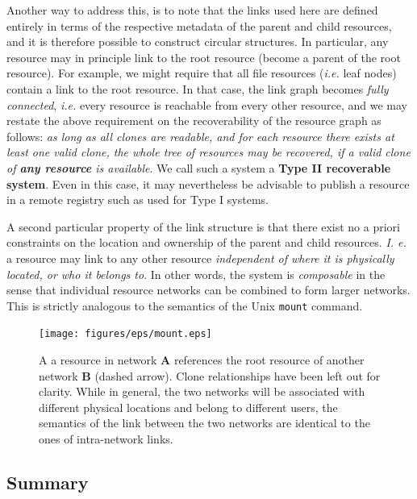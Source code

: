 \documentclass[11pt]{article}
\begin{document}
\begin{mainmatter}
Another way to address this, is to note that the links used here are defined entirely in terms of the respective metadata of the parent and child resources, and it is therefore possible to construct circular structures. In particular, any resource may in principle link to the root resource (become a parent of the root resource). For example, we might require that all file resources (\emph{i.e.} leaf nodes) contain a link to the root resource. In that case, the link graph becomes \emph{fully connected}, \emph{i.e.} every resource is reachable from every other resource, and we may restate the above requirement on the recoverability of the resource graph as follows: \emph{as long as all clones are readable, and for each resource there exists at least one valid clone, the whole tree of resources may be recovered, if a valid clone of \textbf{any resource} is available}. We call such a system a\label{typeTwo} \textbf{Type II recoverable system}. Even in this case, it may nevertheless be advisable to publish a resource in a remote registry such as used for Type I systems.

A second particular property of the link structure is that there exist no a priori constraints on the location and ownership of the parent and child resources. \emph{I. e.} a resource may link to any other resource \emph{independent of where it is physically located, or who it belongs to}. In other words, the system is \emph{composable} in the sense that individual resource networks can be combined to form larger networks. This is strictly analogous to the semantics of the Unix \texttt{mount} command.


\begin{figure}[ht!]
\texttt{[image: figures/eps/mount.eps]}
\caption{
A a resource in network \textbf{A} references the root resource of another network \textbf{B} (dashed arrow). Clone relationships have been left out for clarity. While in general, the two networks will be associated with different physical locations and belong to different users, the semantics of the link between the two networks are identical to the ones of intra-network links. 
}
\end{figure}

\subsection{Summary}


\end{mainmatter}
\end{document}

